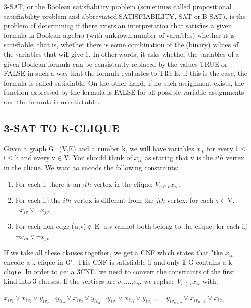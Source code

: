 \documentclass[table]{article}
\begin{document}
\leftskip=0.5in 
3-SAT, or the Boolean satisfiability problem (sometimes called propositional satisfiability problem and abbreviated SATISFIABILITY, SAT or B-SAT), is the problem of determining if there exists an interpretation that satisfies a given formula in Boolean algebra (with unknown number of variables) whether it is satisfiable, that is, whether there is some combination of the (binary) values of the variables that will give 1.
In other words, it asks whether the variables of a given Boolean formula can be consistently replaced by the values TRUE or FALSE in such a way that the formula evaluates to TRUE. If this is the case, the formula is called satisfiable. On the other hand, if no such assignment exists, the function expressed by the formula is FALSE for all possible variable assignments and the formula is unsatisfiable.\newline

\leftskip=0.0in 
\subsection{3-SAT TO K-CLIQUE}

\leftskip=0.5in 
Given a graph G=(V,E) and a number k, we will have variables $x_{iv}$ for every 1$\leq$i$\leq$k and every v$\in$V. You should think of $x_{iv}$ as stating that v is the $ith$ vertex in the clique. We want to encode the following constraints:

\begin{enumerate}\leftskip=0.8in 
\item 	For each i, there is an $ith$ vertex in the clique: $V_{v \in V} x_{iv}$.
\item For each i,j the $ith$ vertex is different from the $jth$ vertex: for each v$\in$V, $\neg x_{iv} \lor \neg x_{jv}$.
\item 	For each non-edge (u,v)$\notin$E, u,v cannot both belong to the clique: for each i,j $\neg x_{iu} \lor \neg x_{jv}$.
\end{enumerate}

\leftskip=0.5in
If we take all these clauses together, we get a CNF which states that "the $x_{iv}$ encode a k-clique in G". This CNF is satisfiable if and only if G contains a k-clique.
In order to get a 3CNF, we need to convert the constraints of the first kind into 3-clauses. If the vertices are $v_1$,...,$v_n$, we replace $V_{v \in V} x_{iv}$ with:

\begin{center}
$x_{iv_1} \lor x_{iv_2} \lor y_{iv_2} $ \newline
$\neg y_{iv_2} \lor x_{iv_3} \lor y_{iv_3} $ \newline
$\neg y_{iv_3} \lor x_{iv_4} \lor y_{iv_4} $ \newline
... \newline
$\neg y_{iv_{n-2}} \lor x_{iv_{n-1}} \lor x_{iv_n} $ \newline
\end{center}
\end{document}
